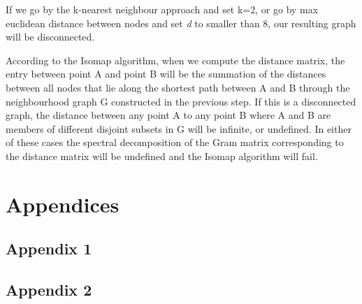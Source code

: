 \documentclass[11pt,a4paper,landscape]{article}
\begin{document}

If we go by the k-nearest neighbour approach and set k=2, or go by max euclidean distance between nodes and set \textit{d} to smaller than 8, our resulting graph will be disconnected.


According to the Isomap algorithm, when we compute the distance matrix, the entry between point A and point B will be the summation of the distances between all nodes that lie along the shortest path between A and B through the neighbourhood graph G constructed in the previous step. If this is a disconnected graph, the distance between any point A to any point B where A and B are members of different disjoint subsets in G will be infinite, or undefined. In either of these cases the spectral decomposition of the Gram matrix corresponding to the distance matrix will be undefined and the Isomap algorithm will fail.




\section{Appendices}
\subsection{Appendix 1}

\subsection{Appendix 2}

\end{document}
